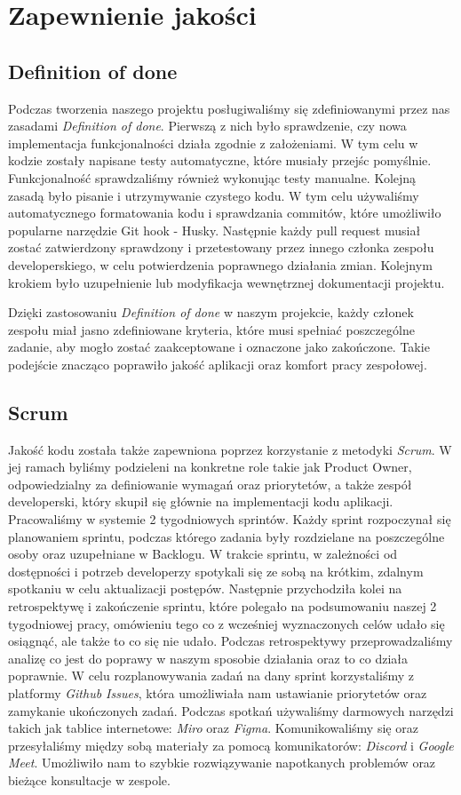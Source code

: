 \chapter{Zapewnienie jakości}

\section{Definition of done}
Podczas tworzenia naszego projektu posługiwaliśmy się zdefiniowanymi przez nas zasadami \emph{Definition of done}. Pierwszą z nich było sprawdzenie, czy nowa implementacja funkcjonalności działa zgodnie z założeniami.
W tym celu w kodzie zostały napisane testy automatyczne, które musiały przejśc pomyślnie. Funkcjonalność sprawdzaliśmy również wykonując testy manualne. Kolejną zasadą było pisanie i utrzymywanie czystego kodu. W tym celu używaliśmy automatycznego
formatowania kodu i sprawdzania commitów, które umożliwiło popularne narzędzie Git hook - Husky. Następnie każdy pull request musiał zostać zatwierdzony sprawdzony i przetestowany przez innego członka zespołu developerskiego, w celu potwierdzenia
poprawnego działania zmian. Kolejnym krokiem było uzupełnienie lub modyfikacja wewnętrznej dokumentacji projektu.

Dzięki zastosowaniu \emph{Definition of done} w naszym projekcie, każdy członek zespołu miał jasno zdefiniowane kryteria, które musi spełniać poszczególne zadanie, aby mogło zostać zaakceptowane i oznaczone jako zakończone. Takie podejście znacząco poprawiło
jakość aplikacji oraz komfort pracy zespołowej.

\section{Scrum}
Jakość kodu została także zapewniona poprzez korzystanie z metodyki \emph{Scrum}. W jej ramach byliśmy podzieleni na konkretne role takie jak Product Owner, odpowiedzialny za definiowanie wymagań oraz priorytetów, a także zespół developerski, który skupił się
głównie na implementacji kodu aplikacji. Pracowaliśmy w systemie 2 tygodniowych sprintów. Każdy sprint rozpoczynał się planowaniem sprintu, podczas którego zadania były rozdzielane na poszczególne osoby oraz uzupełniane w Backlogu. W trakcie sprintu, w zależności od dostępności i potrzeb developerzy spotykali się ze sobą
na krótkim, zdalnym spotkaniu w celu aktualizacji postępów. Następnie przychodziła kolei na retrospektywę i zakończenie sprintu, które polegało na podsumowaniu naszej 2 tygodniowej pracy, omówieniu tego co z wcześniej wyznaczonych celów udało się osiągnąć, ale także to co się nie udało. Podczas retrospektywy
przeprowadzaliśmy analizę co jest do poprawy w naszym sposobie działania oraz to co działa poprawnie. W celu rozplanowywania
zadań na dany sprint korzystaliśmy z platformy \emph{Github Issues}, która umożliwiała nam ustawianie priorytetów oraz zamykanie ukończonych zadań. Podczas spotkań używaliśmy darmowych narzędzi takich jak tablice internetowe: \emph{Miro} oraz \emph{Figma}. Komunikowaliśmy się oraz przesyłaliśmy między sobą materiały
za pomocą komunikatorów: \emph{Discord} i \emph{Google Meet}. Umożliwiło nam to szybkie rozwiązywanie napotkanych problemów oraz bieżące konsultacje w zespole.

